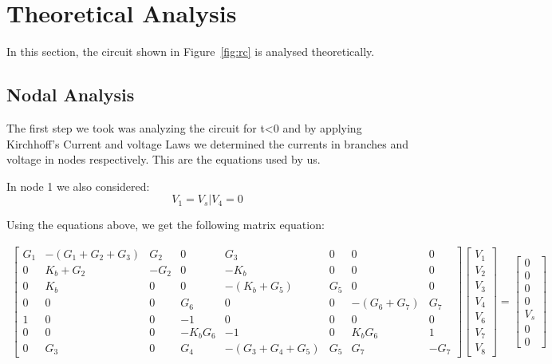 \section{Theoretical Analysis}
\label{sec:analysis}

In this section, the circuit shown in Figure~\ref{fig:rc} is analysed
theoretically.

\subsection{Nodal Analysis}

The first step we took was analyzing the circuit for t<0 and by applying Kirchhoff's Current and voltage Laws we determined the currents in branches and voltage in nodes respectively. This are the equations used by us.

In node 1 we also considered:
\begin{equation}
	V_1 = V_s | V_4 = 0
\end{equation}


Using the equations above, we get the following matrix equation:
\usepackage{amsmath}
\begin{gather}
	\begin{bmatrix}
		G_1 & -(G_1 + G_2 + G_3) & G_2 & 0 & G_3 & 0 & 0 & 0 \\ 
		0 & K_b + G_2 & -G_2 & 0 & -K_b & 0 & 0 & 0 \\
		0 & K_b & 0 & 0 & -(K_b + G_5) & G_5 & 0 & 0 \\ 
		0 & 0 & 0 & G_6 & 0 & 0 & -(G_6 + G_7) & G_7 \\
		1 & 0 & 0 & -1 & 0 & 0 & 0 & 0 \\
		0 & 0 & 0 & -K_bG_6 & -1 & 0 & K_bG_6 & 1 \\
		0 & G_3 & 0 & G_4 & -(G_3 + G_4 + G_5) & G_5 & G_7 & -G_7
	\end{bmatrix}
	\begin{bmatrix} V_1 \\ V_2 \\ V_3 \\ V_4 \\ V_6 \\ V_7 \\ V_8 \end{bmatrix}
	=
	\begin{bmatrix} 0 \\ 0 \\ 0 \\ 0 \\ V_s \\ 0 \\ 0 \end{bmatrix}
\end{gather}

